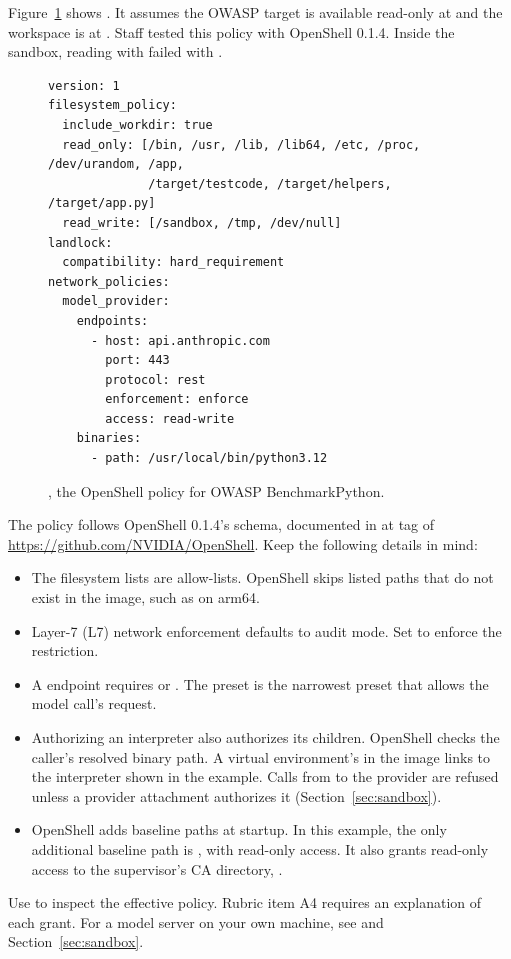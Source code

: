 \documentclass[9pt,letterpaper]{article}
\begin{document}
Figure~\ref{fig:policy} shows . It assumes the
OWASP target is available read-only at  and the workspace is at
. Staff tested this policy with OpenShell 0.1.4. Inside the
sandbox, reading  with  failed
with .

\begin{figure}[tbp]
\begin{verbatim}
version: 1
filesystem_policy:
  include_workdir: true
  read_only: [/bin, /usr, /lib, /lib64, /etc, /proc, /dev/urandom, /app,
              /target/testcode, /target/helpers, /target/app.py]
  read_write: [/sandbox, /tmp, /dev/null]
landlock:
  compatibility: hard_requirement
network_policies:
  model_provider:
    endpoints:
      - host: api.anthropic.com
        port: 443
        protocol: rest
        enforcement: enforce
        access: read-write
    binaries:
      - path: /usr/local/bin/python3.12
\end{verbatim}
\caption{, the OpenShell policy for OWASP BenchmarkPython.}\label{fig:policy}
\end{figure}

The policy follows OpenShell 0.1.4's schema, documented in
 at tag  of
\url{https://github.com/NVIDIA/OpenShell}. Keep the following details in mind:
\begin{itemize}
\item The filesystem lists are allow-lists. OpenShell skips listed paths that do
  not exist in the image, such as  on arm64.
\item Layer-7 (L7) network enforcement defaults to audit mode. Set
   to enforce the restriction.
\item A  endpoint requires  or . The
   preset is the narrowest preset that allows the model call's
   request.
\item Authorizing an interpreter also authorizes its children. OpenShell checks
  the caller's resolved binary path. A virtual environment's  in
  the  image links to the interpreter shown in the example.
  Calls from  to the provider are refused unless a provider attachment
  authorizes it (Section~\ref{sec:sandbox}).
\item OpenShell adds baseline paths at startup. In this example, the only
  additional baseline path is , with read-only access. It also
  grants read-only access to the supervisor's CA directory,
  .
\end{itemize}
Use  to inspect the effective policy.
Rubric item A4 requires an explanation of each grant. For a model server on your
own machine, see  and
Section~\ref{sec:sandbox}.
\end{document}
